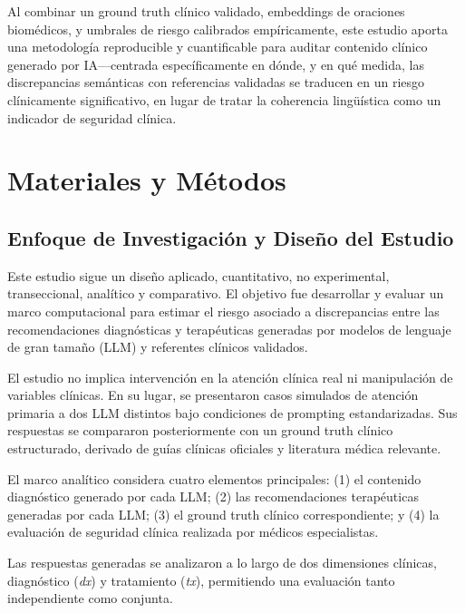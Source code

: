 \documentclass[final,11pt,3p]{elsarticle}
\begin{document}
Al combinar un ground truth clínico validado, embeddings de oraciones biomédicos, y umbrales de riesgo calibrados empíricamente, este estudio aporta una metodología reproducible y cuantificable para auditar contenido clínico generado por IA---centrada específicamente en dónde, y en qué medida, las discrepancias semánticas con referencias validadas se traducen en un riesgo clínicamente significativo, en lugar de tratar la coherencia lingüística como un indicador de seguridad clínica.


\section{Materiales y Métodos}
\label{S:2}

\subsection{Enfoque de Investigación y Diseño del Estudio}
\label{S:2.1}

Este estudio sigue un diseño aplicado, cuantitativo, no experimental, transeccional, analítico y comparativo. El objetivo fue desarrollar y evaluar un marco computacional para estimar el riesgo asociado a discrepancias entre las recomendaciones diagnósticas y terapéuticas generadas por modelos de lenguaje de gran tamaño (LLM) y referentes clínicos validados.

El estudio no implica intervención en la atención clínica real ni manipulación de variables clínicas. En su lugar, se presentaron casos simulados de atención primaria a dos LLM distintos bajo condiciones de prompting estandarizadas. Sus respuestas se compararon posteriormente con un ground truth clínico estructurado, derivado de guías clínicas oficiales y literatura médica relevante.

El marco analítico considera cuatro elementos principales: (1) el contenido diagnóstico generado por cada LLM; (2) las recomendaciones terapéuticas generadas por cada LLM; (3) el ground truth clínico correspondiente; y (4) la evaluación de seguridad clínica realizada por médicos especialistas.

Las respuestas generadas se analizaron a lo largo de dos dimensiones clínicas, diagnóstico (\textit{dx}) y tratamiento (\textit{tx}), permitiendo una evaluación tanto independiente como conjunta.
\end{document}
